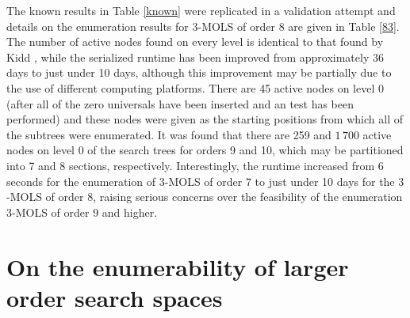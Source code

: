 The known results in Table \ref{known} were replicated in a validation attempt and details on the enumeration results for $3$-MOLS of order 8 are given in Table \ref{83}. The number of active nodes found  on every level is identical to that found by Kidd \cite{Kidd2012}%
, while the serialized runtime has been improved from approximately 36 days to just under 10 days, although this improvement may be partially due to the use of different computing platforms. There are 45 active nodes on level 0 (after all of the zero universals have been inserted  and an \iis test has been performed) and these nodes were given as the starting positions from which all of the subtrees were enumerated. It was found that there are 259 and $1\,700$ active nodes on level 0 of the search trees for orders 9 and 10, which may be partitioned into 7 and 8 sections, respectively. Interestingly, the runtime increased from 6 seconds for the enumeration of $3$-MOLS of order 7 to just under 10 days for the $3$-MOLS of order  8, raising serious concerns over the feasibility of the enumeration $3$-MOLS of order 9 and higher. 

\section{On the enumerability of larger order search spaces}

